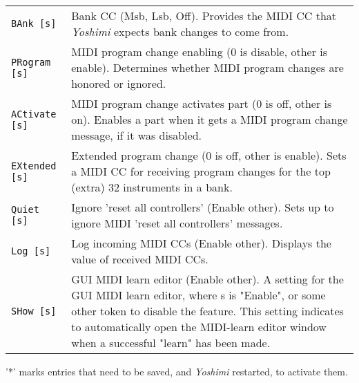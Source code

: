 \begin{center}
\begin{longtable}{p{4cm} p{10cm}}
\texttt{BAnk [s]} &
   Bank CC (Msb, Lsb, Off).
   Provides the MIDI CC that \textsl{Yoshimi} expects
   bank changes to come from.  \\
\texttt{PRogram [s]} &
   MIDI program change enabling (0 is disable, other is enable).
   Determines whether MIDI program changes are honored or ignored.  \\
\texttt{ACtivate [s]} &
   MIDI program change activates part (0 is off, other is on).
   Enables a part when it gets a MIDI program change message,
   if it was disabled.  \\
\texttt{EXtended [s]} &
   Extended program change (0 is off, other is enable).
   Sets a MIDI CC for receiving program changes for the top (extra)
   32 instruments in a bank.  \\
\texttt{Quiet [s]} &
   Ignore 'reset all controllers' (Enable other).
   Sets up to ignore MIDI 'reset all controllers' messages. \\
\texttt{Log [s]} &
   Log incoming MIDI CCs (Enable other).
   Displays the value of received MIDI CCs. \\
\texttt{SHow [s]} &
   GUI MIDI learn editor (Enable other).
   A setting for the GUI MIDI learn editor, where s is "Enable", or some
   other token to disable the feature.
   This setting indicates to automatically open the MIDI-learn editor window
   when a successful "learn" has been made.  \\

\end{longtable}
\end{center}


   '*' marks entries that need to be saved, and \textsl{Yoshimi}
   restarted, to activate them.

